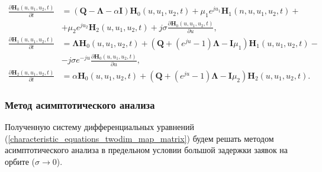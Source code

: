 \begin{equation} \label{characteristic_equations_twodim_map_matrix}
	\begin{split}
		\frac{{\partial \boldsymbol{H}_{0}(u,u_{1},u_{2},t)}}{{\partial t}} &= (\boldsymbol{Q}-\boldsymbol{\Lambda}-\alpha\boldsymbol{I})\boldsymbol{H}_{0}(u,u_{1},u_{2},t) + \mu_{1} e^{ju_{1}}\boldsymbol{H}_{1}(n,u,u_{1},u_{2},t)  + \\  &+ \mu_{2}e^{ju_{2}}\boldsymbol{H}_{2}(u,u_{1},u_{2},t) + j\sigma
		\frac{{\partial \boldsymbol{H}_{0}(u,u_{1},u_{2},t)}}{{\partial u}},
		\\
		\frac{{\partial \boldsymbol{H}_{1}(u,u_{1},u_{2},t)}}{{\partial t}} &= \boldsymbol{\Lambda} \boldsymbol{H}_{0}(u,u_{1},u_{2},t) +  (\boldsymbol{Q}+(e^{ju}-1)\boldsymbol{\Lambda} - \boldsymbol{I}\mu_{1})\boldsymbol{H}_{1}(u,u_{1},u_{2},t) -\\ &- j\sigma e^{-ju}
		\frac{{\partial \boldsymbol{H}_{0}(u,u_{1},u_{2},t)}}{{\partial u}},
		\\
		\frac{{\partial \boldsymbol{H}_{2}(u,u_{1},u_{2},t)}}{{\partial t}} &= \alpha \boldsymbol{H}_{0}(u,u_{1},u_{2},t) + (\boldsymbol{Q}+(e^{ju}-1)\boldsymbol{\Lambda} - \boldsymbol{I}\mu_{2})\boldsymbol{H}_{2}(u,u_{1},u_{2},t).
	\end{split}
\end{equation} 
\subsubsection{Метод асимптотического анализа}
Полученную систему дифференциальных уравнений (\ref{characteristic_equations_twodim_map_matrix}) будем решать методом асимптотического анализа в предельном условии большой задержки заявок на орбите ($\sigma \xrightarrow{} 0$).


